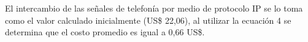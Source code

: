 \begin{itemize}
El intercambio de las señales de telefonía por medio de protocolo IP se lo toma como el valor calculado inicialmente (US\$ 22,06), al utilizar la ecuación 4 se determina que el costo promedio es igual a 0,66 US\$.
%
%
%
%





%
%
%
%
%






\end{itemize}
